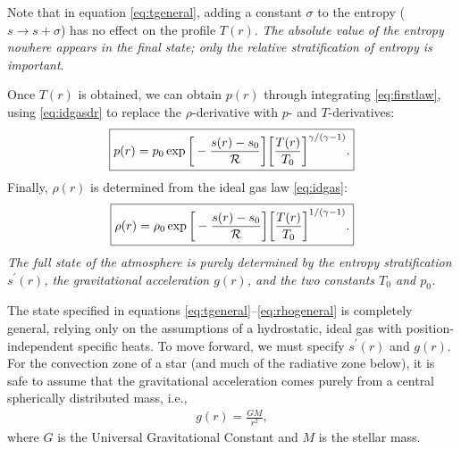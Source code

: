 \documentclass[12pt]{article} %
\begin{document}
	Note that in equation \eqref{eq:tgeneral}, adding a constant $\sigma$ to the entropy ($s\longrightarrow s+\sigma$) has no effect on the profile $T(r)$. \textit{The absolute value of the entropy nowhere appears in the final state; only the relative stratification of entropy is important}. 
	
	Once $T(r)$ is obtained, we can obtain $p(r)$ through integrating \eqref{eq:firstlaw}, using \eqref{eq:idgasdr} to replace the $\rho$-derivative with $p$- and $T$-derivatives:
	\begin{align}
	\boxed{
	p(r)=p_0\exp\bigg{[}-\frac{s(r) - s_0}{\mathcal{R}}\bigg{]}\bigg{[}\frac{T(r)}{T_0}\bigg{]}^{\gamma/(\gamma - 1)}.
}
\label{eq:pgeneral}
	\end{align}
	Finally, $\rho(r)$ is determined from the ideal gas law \eqref{eq:idgas}:
	\begin{align}
	\boxed{
	\rho(r) =\rho_0\exp\bigg{[}-\frac{s(r) - s_0}{\mathcal{R}}\bigg{]}\bigg{[}\frac{T(r)}{T_0}\bigg{]}^{1/(\gamma - 1)}.
}
\label{eq:rhogeneral}
	\end{align}
	\textit{The full state of the atmosphere is purely determined by the entropy stratification $s^\prime(r)$, the gravitational acceleration $g(r)$, and the two constants $T_0$ and $p_0$.}
	
	The state specified in equations \eqref{eq:tgeneral}--\eqref{eq:rhogeneral} is completely general, relying only on the assumptions of a hydrostatic, ideal gas with position-independent specific heats. To move forward, we must specify $s^\prime(r)$ and $g(r)$. For the convection zone of a star (and much of the radiative zone below), it is safe to assume that the gravitational acceleration comes purely from a central spherically distributed mass, i.e., 
	\begin{align}
	g(r)=\frac{GM}{r^2},
	\label{eq:gpointmass}
	\end{align}
	where $G$ is the Universal Gravitational Constant and $M$ is the stellar mass. 
\end{document}
